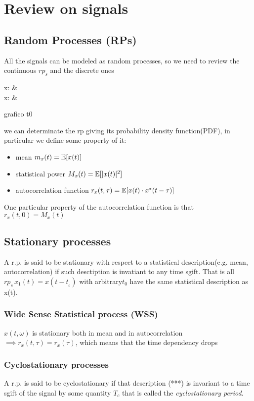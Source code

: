 \chapter{Review on signals}

\section{Random Processes (RPs)}
All the signals can be modeled as random processes, so we need to review the continuous $rp_s$ and the discrete ones

\begin{esp}
  x: \quad &\R \times \Omega \to \R \\
  x:  \quad& \Z \times \Omega \to \R
\end{esp}

grafico t0

we can determinate the rp giving its probability density function(PDF), in particular we define some property of it:
\begin{itemize}
  \item mean $m_x(t)=\mathbb{E}[x(t)]$
  \item statistical power $M_x(t)=\mathbb{E}[|x(t)|^2]$
  \item autocorrelation function $r_x(t,\tau)=\mathbb{E}[x(t)\cdot x^*(t-\tau)]$
\end{itemize}
One particular property of the autocorrelation function is that $r_x(t,0)=M_x(t)$

\section{Stationary processes}
A r.p. is said to be stationary with respect to a statistical description(e.g. mean, autocorrelation) if such desctiption is invatiant to any time sgift. That is all $rp_s \, x_1(t) = x(t-t_{_0})$ with arbitrary$t_0$ have the same statistical description as x(t).

\subsection{Wide Sense Statistical process (WSS)}
$x(t,\omega)$ is stationary both in mean and in autocorrelation $\implies r_x(t,\tau) = r_x(\tau)$, which means that the time dependency drops

\subsection{Cyclostationary processes}
A r.p. is said to be cyclostationary if that description (***) is invariant to a time sgift of the signal by some quantity $T_c$ that is called the \emph{cyclostationary period}.

